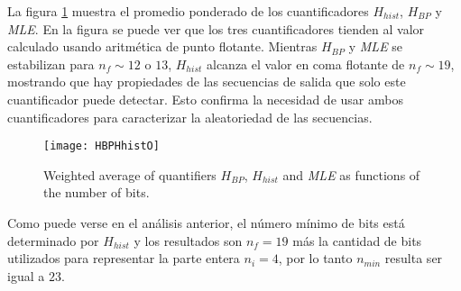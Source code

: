 La figura \ref{fig:HBPHhist} muestra el promedio ponderado de los cuantificadores $H_{hist}$, $H_{BP}$ y \textsl{MLE}.
En la figura se puede ver que los tres cuantificadores tienden al valor calculado usando aritmética de punto flotante.
Mientras $H_{BP}$ y \textsl{MLE} se estabilizan para $n_f \sim 12$ o $13$, $H_{hist}$ alcanza el valor en coma flotante de $n_f \sim 19$, mostrando que hay propiedades de las secuencias de salida que solo este cuantificador puede detectar.
Esto confirma la necesidad de usar ambos cuantificadores para caracterizar la aleatoriedad de las secuencias.
%
\begin{figure}
    \centering
        \texttt{[image: HBPHhistO]}\\
    \caption{Weighted average of quantifiers $H_{BP}$,  $H_{hist}$ and \textsl{MLE} as functions of the number of bits.}\label{fig:HBPHhist}
\end{figure}
%
Como puede verse en el análisis anterior, el número mínimo de bits está determinado por $H_{hist}$ y los resultados son $n_f = 19$ más la cantidad de bits utilizados para representar la parte entera $n_i = 4$, por lo tanto $n_{min}$ resulta ser igual a $23$.
